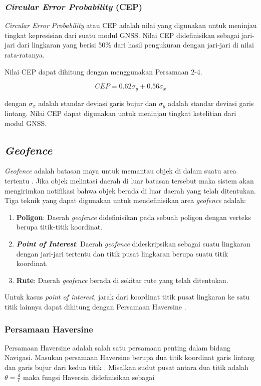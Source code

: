 \subsubsection{\textit{Circular Error Probability} (CEP)}
\textit{Circular Error Probability} atau CEP adalah nilai yang digunakan untuk meninjau tingkat kepresisian dari suatu modul GNSS. Nilai CEP didefinisikan sebagai jari-jari dari lingkaran yang berisi 50\% dari hasil pengukuran dengan jari-jari di nilai rata-ratanya.

Nilai CEP dapat dihitung dengan menggunakan Persamaan 2-4.

\begin{equation}
CEP = 0.62 \sigma_y + 0.56 \sigma_x
\label{eq:2-4}
\end{equation}

dengan $\sigma_x$ adalah standar deviasi garis bujur dan $\sigma_y$ adalah standar deviasi garis lintang. Nilai CEP dapat digunakan untuk meninjau tingkat ketelitian dari modul GNSS.

\subsection{\textit{Geofence}}
\textit{Geofence} adalah batasan maya untuk memantau objek di dalam suatu area tertentu \cite{Sari2021}. Jika objek melintasi daerah di luar batasan tersebut maka sistem akan mengirimkan notifikasi bahwa objek berada di luar daerah yang telah ditentukan. Tiga teknik yang dapat digunakan untuk mendefinisikan area \textit{geofence} \cite{Rui2015} adalah:

\begin{enumerate}
	\item \textbf{Poligon}: Daerah \textit{geofence} didefinisikan pada sebuah poligon dengan verteks berupa titik-titik koordinat.
	\item \textbf{\textit{Point of Interest}}: Daerah \textit{geofence} dideskripsikan sebagai suatu lingkaran dengan jari-jari tertentu dan titik pusat lingkaran berupa suatu titik koordinat.
	\item \textbf{Rute}: Daerah \textit{geofence} berada di sekitar rute yang telah ditentukan.
\end{enumerate}

Untuk kasus \textit{point of interest}, jarak dari koordinat titik pusat lingkaran ke satu titik lainnya dapat dihitung dengan Persamaan Haversine \cite{Pratama2020}.

\subsubsection{Persamaan Haversine}
Persamaan Haversine adalah salah satu persamaan penting dalam bidang Navigasi. Masukan persamaan Haversine berupa dua titik koordinat garis lintang dan garis bujur dari kedua titik \cite{Hofmann-Wellenhof2008}\cite{Feng2013}.  Misalkan sudut pusat antara dua titik adalah $\theta = \frac{d}{r}$ maka fungsi Haversin didefinisikan sebagai

